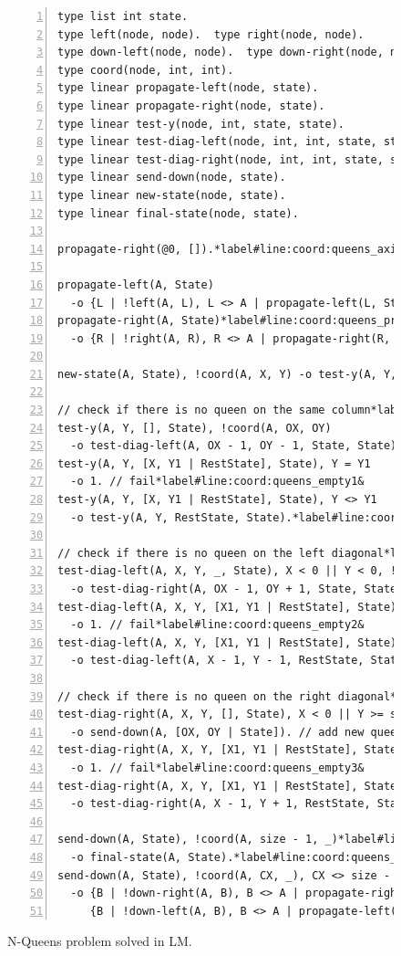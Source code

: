 \begin{figure}[ht]
\begin{Verbatim}[numbers=left,fontsize=\scriptsize,commandchars=\*\#\&]
type list int state.
type left(node, node).  type right(node, node).
type down-left(node, node).  type down-right(node, node).
type coord(node, int, int).
type linear propagate-left(node, state).
type linear propagate-right(node, state).
type linear test-y(node, int, state, state).
type linear test-diag-left(node, int, int, state, state).
type linear test-diag-right(node, int, int, state, state).
type linear send-down(node, state).
type linear new-state(node, state).
type linear final-state(node, state).

propagate-right(@0, []).*label#line:coord:queens_axiom&

propagate-left(A, State)
  -o {L | !left(A, L), L <> A | propagate-left(L, State)}, new-state(A, State).
propagate-right(A, State)*label#line:coord:queens_propr1&
  -o {R | !right(A, R), R <> A | propagate-right(R, State)}, new-state(A, State).*label#line:coord:queens_propr2&

new-state(A, State), !coord(A, X, Y) -o test-y(A, Y, State, State).

// check if there is no queen on the same column*label#line:coord:queens_col1&
test-y(A, Y, [], State), !coord(A, OX, OY)
  -o test-diag-left(A, OX - 1, OY - 1, State, State).
test-y(A, Y, [X, Y1 | RestState], State), Y = Y1
  -o 1. // fail*label#line:coord:queens_empty1&
test-y(A, Y, [X, Y1 | RestState], State), Y <> Y1
  -o test-y(A, Y, RestState, State).*label#line:coord:queens_col2&

// check if there is no queen on the left diagonal*label#line:coord:queens_ldiag1&
test-diag-left(A, X, Y, _, State), X < 0 || Y < 0, !coord(A, OX, OY)
  -o test-diag-right(A, OX - 1, OY + 1, State, State).
test-diag-left(A, X, Y, [X1, Y1 | RestState], State), X = X1, Y = Y1
  -o 1. // fail*label#line:coord:queens_empty2&
test-diag-left(A, X, Y, [X1, Y1 | RestState], State), X <> X1 || Y <> Y1
  -o test-diag-left(A, X - 1, Y - 1, RestState, State).*label#line:coord:queens_ldiag2&

// check if there is no queen on the right diagonal*label#line:coord:queens_rdiag1&
test-diag-right(A, X, Y, [], State), X < 0 || Y >= size, !coord(A, OX, OY)
  -o send-down(A, [OX, OY | State]). // add new queen*label#line:coord:queens_add&
test-diag-right(A, X, Y, [X1, Y1 | RestState], State), X = X1, Y = Y1
  -o 1. // fail*label#line:coord:queens_empty3&
test-diag-right(A, X, Y, [X1, Y1 | RestState], State), X <> X1 || Y <> Y1
  -o test-diag-right(A, X - 1, Y + 1, RestState, State).*label#line:coord:queens_rdiag2&

send-down(A, State), !coord(A, size - 1, _)*label#line:coord:queens_complete1&
  -o final-state(A, State).*label#line:coord:queens_complete2&
send-down(A, State), !coord(A, CX, _), CX <> size - 1*label#line:coord:queens_down1&
  -o {B | !down-right(A, B), B <> A | propagate-right(B, State)},
     {B | !down-left(A, B), B <> A | propagate-left(B, State)}.*label#line:coord:queens_down2&
\end{Verbatim}
  \caption{N-Queens problem solved in LM.}
  \label{coordination:code:nqueens}
\end{figure}

